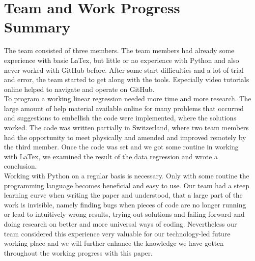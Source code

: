 \documentclass[12pt,a4paper,bibliography=totocnumbered,listof=totocnumbered]{scrartcl}
\begin{document}
\section{Team and Work Progress Summary}
The team consisted of three members. The team members had already some experience with basic LaTex, but little or no experience with Python and also never worked with GitHub before. After some start difficulties and a lot of trial and error, the team started to get along with the tools. Especially video tutorials online helped to navigate and operate on GitHub. 
\ \\ 

To program a working linear regression needed more time and more research. The large amount of help material available online for many problems that occurred and suggestions to embellish the code were implemented, where the solutions worked. The code was written partially in Switzerland, where two team members had the opportunity to meet physically and amended and improved remotely by the third member. Once the code was set and we got some routine in working with LaTex, we examined the result of the data regression and wrote a conclusion. 
 \ \\

Working with Python on a regular basis is necessary. Only with some routine the programming language becomes beneficial and easy to use. Our team had a steep learning curve when writing the paper and understood, that a large part of the work is invisible, namely finding bugs when pieces of code are no longer running or lead to intuitively wrong results, trying out solutions and failing forward and doing research on better and more universal ways of coding. Nevertheless our team considered this experience very valuable for our technology-led future working place and we will further enhance the knowledge we have gotten throughout the working progress with this paper.

%



\end{document}
